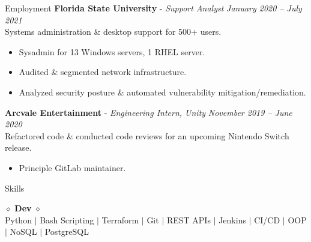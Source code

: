 \documentclass{resume} %
\begin{document}
{\begin{rSection}{Employment}
		{\bf Florida State University} - {\em Support Analyst} \hfill {\em January 2020 – July 2021} \\
		Systems administration \& desktop support for 500+ users.
		\begin{itemize}
			\vspace{-0.2cm} \item Sysadmin for 13 Windows servers, 1 RHEL server.
			\vspace{-0.2cm} \item Audited \& segmented network infrastructure.
			\vspace{-0.2cm} \item Analyzed security posture \& automated vulnerability mitigation/remediation.
		\end{itemize}
		{\bf Arcvale Entertainment} - {\em Engineering Intern, Unity} \hfill {\em November 2019 – June 2020}\\
		Refactored code \& conducted code reviews for an upcoming Nintendo Switch release.
		\begin{itemize}
			\vspace{-0.2cm} \item Principle GitLab maintainer.
		\end{itemize}
	\vspace{-2ex}
	\end{rSection}
		\begin{rSection}{Skills}
			\begin{center}
				$\diamond$ {\bf Dev }$\diamond$ \\
				Python $\mid$ Bash Scripting $\mid$ Terraform $\mid$ Git $\mid$ REST APIs $\mid$ Jenkins $\mid$ CI/CD $\mid$ OOP $\mid$ NoSQL $\mid$ PostgreSQL\\
				

\end{center}
\end{rSection}}
\end{document}
